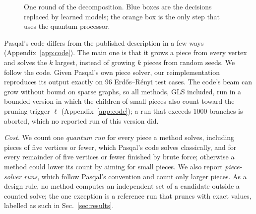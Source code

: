\documentclass[10pt,pra,aps,twocolumn,superscriptaddress,floatfix,nofootinbib]{revtex4-2}
\newcommand{\GLS}{GLS}
\begin{document}
\begin{figure}[t]
\centering
{}
\caption{One round of the decomposition. Blue boxes are the decisions replaced by learned models; the orange box is the only step that uses the quantum processor.}
\label{fig:loop}
\end{figure}

Pasqal's code differs from the published description in a few ways (Appendix~\ref{app:code}). The main one is that it grows a piece from every vertex and solves the $k$ largest, instead of growing $k$ pieces from random seeds. We follow the code. Given Pasqal's own piece solver, our reimplementation reproduces its output exactly on 96 Erd\H{o}s--R\'enyi test cases. The code's beam can grow without bound on sparse graphs, so all methods, \GLS{} included, run in a bounded version in which the children of small pieces also count toward the pruning trigger $\ell$ (Appendix~\ref{app:code}); a run that exceeds 1000 branches is aborted, which no reported run of this version did.

\textit{Cost.} We count one \emph{quantum run} for every piece a method solves, including pieces of five vertices or fewer, which Pasqal's code solves classically, and for every remainder of five vertices or fewer finished by brute force; otherwise a method could lower its count by aiming for small pieces. We also report \emph{piece-solver runs}, which follow Pasqal's convention and count only larger pieces. As a design rule, no method computes an independent set of a candidate outside a counted solve; the one exception is a reference run that prunes with exact values, labelled as such in Sec.~\ref{sec:results}.
\end{document}
